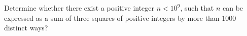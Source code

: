 Determine whether there exist a positive integer $n<10^9$, such that $n$ can be expressed as a sum of three squares of positive integers by more than $1000$ distinct ways?